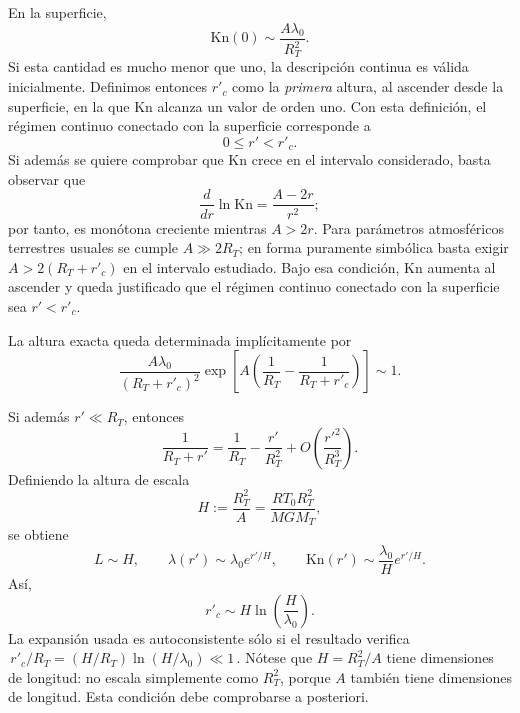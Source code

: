 \documentclass[12pt]{article}
\begin{document}
En la superficie,
\begin{equation}
\mathrm{Kn}(0)\sim\frac{A\lambda_0}{R_T^2}.
\end{equation}
Si esta cantidad es mucho menor que uno, la descripción continua es válida inicialmente. Definimos entonces $r'_c$ como la \emph{primera} altura, al ascender desde la superficie, en la que $\mathrm{Kn}$ alcanza un valor de orden uno. Con esta definición, el régimen continuo conectado con la superficie corresponde a
\begin{equation}
\boxed{0\le r'<r'_c}.
\end{equation}
Si además se quiere comprobar que $\mathrm{Kn}$ crece en el intervalo considerado, basta observar que
\begin{equation}
\frac{d}{dr}\ln\mathrm{Kn}=\frac{A-2r}{r^2};
\end{equation}
por tanto, es monótona creciente mientras $A>2r$. Para parámetros atmosféricos terrestres usuales se cumple $A\gg 2R_T$; en forma puramente simbólica basta exigir $A>2(R_T+r'_c)$ en el intervalo estudiado. Bajo esa condición, $\mathrm{Kn}$ aumenta al ascender y queda justificado que el régimen continuo conectado con la superficie sea $r'<r'_c$.

La altura exacta queda determinada implícitamente por
\begin{equation}
\frac{A\lambda_0}{(R_T+r'_c)^2}
\exp\left[A\left(\frac1{R_T}-\frac{1}{R_T+r'_c}\right)\right]\sim1.
\end{equation}

Si además $r'\ll R_T$, entonces
\begin{equation}
\frac1{R_T+r'}=\frac1{R_T}-\frac{r'}{R_T^2}+O\!\left(\frac{r'^2}{R_T^3}\right).
\end{equation}
Definiendo la altura de escala
\begin{equation}
H:=\frac{R_T^2}{A}=\frac{RT_0R_T^2}{MGM_T},
\end{equation}
se obtiene
\begin{equation}
L\sim H,
\qquad
\lambda(r')\sim\lambda_0e^{r'/H},
\qquad
\mathrm{Kn}(r')\sim\frac{\lambda_0}{H}e^{r'/H}.
\end{equation}
Así,
\begin{equation}
\boxed{r'_c\sim H\ln\left(\frac{H}{\lambda_0}\right)}.
\end{equation}
La expansión usada es autoconsistente sólo si el resultado verifica
$\,r'_c/R_T=(H/R_T)\ln(H/\lambda_0)\ll1\,$. Nótese que $H=R_T^2/A$ tiene dimensiones de longitud: no escala simplemente como $R_T^2$, porque $A$ también tiene dimensiones de longitud. Esta condición debe comprobarse a posteriori.
\end{document}
